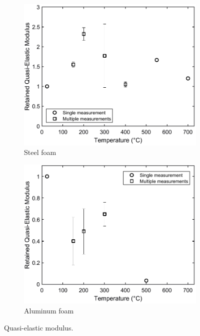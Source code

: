 \documentclass[review]{elsarticle}
\begin{document}
\begin{figure}
	\centering
	\begin{subfigure}{0.50\textwidth}
		\centering
		\includegraphics[width=0.90\linewidth]
		{Tex-Figures/Fig17a-qElast-Fe.pdf}
		\caption{Steel foam}
		\label{fig:Quasi-elast-modulus_Steel}
	\end{subfigure}%
	\begin{subfigure}{0.50\textwidth}
		\centering
		\includegraphics[width=0.90\linewidth]
		{Tex-Figures/Fig17b-qElast-Al.pdf}
		\caption{Aluminum foam}
		\label{fig:Quasi-elast-modulus_Al}
	\end{subfigure}
	\caption{ Quasi-elastic modulus.}
	\label{fig:Quasi-elast-modulus}
\end{figure}
\end{document}
